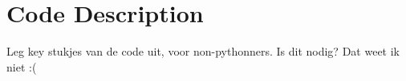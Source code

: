 
\section{Code Description}
Leg key stukjes van de code uit, voor non-pythonners. Is dit nodig? Dat weet ik niet :(

